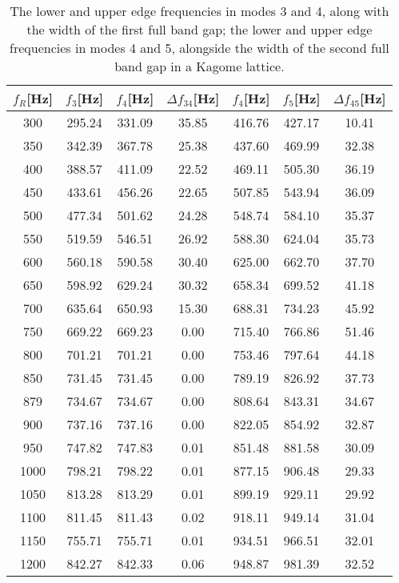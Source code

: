 \documentclass{article}
\begin{document}
\begin{table}[htb]
\centering
\caption{The lower and upper edge frequencies in modes 3 and 4, along with the width of the first full band gap; the lower and upper edge frequencies in modes 4 and 5, alongside the width of the second full band gap in a Kagome lattice.}
\label{tab500}
\begin{tabular}{ccccccc}
\hline
$f_R$[Hz] & $f_3$[Hz] & $f_4$[Hz] & $\Delta f_{34}$[Hz] & $f_4$[Hz] & $f_5$[Hz] & $\Delta f_{45}$[Hz] \\ \hline
300 & 295.24 & 331.09 & 35.85 & 416.76 & 427.17 & 10.41 \\ \hline
350 & 342.39 & 367.78 & 25.38 & 437.60 & 469.99 & 32.38 \\ \hline
400 & 388.57 & 411.09 & 22.52 & 469.11 & 505.30 & 36.19 \\ \hline
450 & 433.61 & 456.26 & 22.65 & 507.85 & 543.94 & 36.09 \\ \hline
500 & 477.34 & 501.62 & 24.28 & 548.74 & 584.10 & 35.37 \\ \hline
550 & 519.59 & 546.51 & 26.92 & 588.30 & 624.04 & 35.73 \\ \hline
600 & 560.18 & 590.58 & 30.40 & 625.00 & 662.70 & 37.70 \\ \hline
650 & 598.92 & 629.24 & 30.32 & 658.34 & 699.52 & 41.18 \\ \hline
700 & 635.64 & 650.93 & 15.30 & 688.31 & 734.23 & 45.92 \\ \hline
750 & 669.22 & 669.23 & 0.00 & 715.40 & 766.86 & 51.46 \\ \hline
800 & 701.21 & 701.21 & 0.00 & 753.46 & 797.64 & 44.18 \\ \hline
850 & 731.45 & 731.45 & 0.00 & 789.19 & 826.92 & 37.73 \\ \hline
879 & 734.67 & 734.67 & 0.00 & 808.64 & 843.31 & 34.67 \\ \hline
900 & 737.16 & 737.16 & 0.00 & 822.05 & 854.92 & 32.87 \\ \hline
950 & 747.82 & 747.83 & 0.01 & 851.48 & 881.58 & 30.09 \\ \hline
1000 & 798.21 & 798.22 & 0.01 & 877.15 & 906.48 & 29.33 \\ \hline
1050 & 813.28 & 813.29 & 0.01 & 899.19 & 929.11 & 29.92 \\ \hline
1100 & 811.45 & 811.43 & 0.02 & 918.11 & 949.14 & 31.04 \\ \hline
1150 & 755.71 & 755.71 & 0.01 & 934.51 & 966.51 & 32.01 \\ \hline
1200 & 842.27 & 842.33 & 0.06 & 948.87 & 981.39 & 32.52 \\ \hline
\end{tabular}
\end{table}
\end{document}
